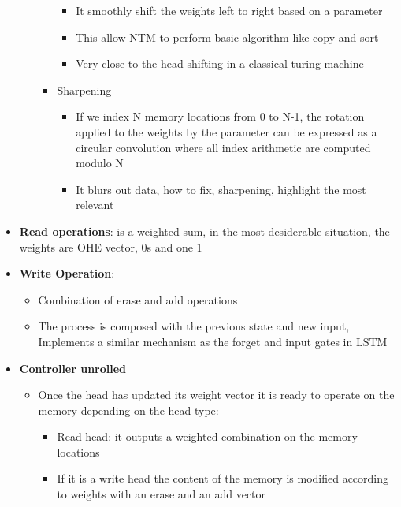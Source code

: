 \begin{itemize}
\begin{itemize}
\begin{itemize}
\begin{itemize}
                \item It smoothly shift the weights left to right based on a parameter
                \item This allow NTM to perform basic algorithm like copy and sort
                \item Very close to the head shifting in a classical turing machine
            \end{itemize}
            \item Sharpening
            \begin{itemize}
                \item If we index N memory locations from 0 to N-1, the rotation applied to the weights by the parameter can be expressed as a circular convolution where all index arithmetic are computed modulo N
                \item It blurs out data, how to fix, sharpening, highlight the most relevant
            \end{itemize}
        \end{itemize}
    \end{itemize}
    \item \textbf{Read operations}: is a weighted sum, in the most desiderable situation, the weights are OHE vector, 0s and one 1
    \item \textbf{Write Operation}:
    \begin{itemize}
        \item Combination of erase and add operations
        \item The process is composed with the previous state and new input, Implements a similar mechanism as the forget and input gates in LSTM
    \end{itemize}
    \item \textbf{Controller unrolled}
    \begin{itemize}
        \item Once the head has updated its weight vector it is ready to operate on the memory depending on the head type:
        \begin{itemize}
            \item Read head: it outputs a weighted combination on the memory locations
            \item If it is a write head the content of the memory is modified according to weights with an erase and an add vector
        \end{itemize}
    \end{itemize}
\end{itemize}


